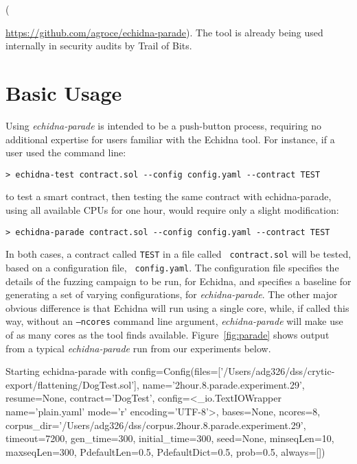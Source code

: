 \documentclass[sigconf]{acmart}
\begin{document}
({\url{https://github.com/agroce/echidna-parade}).  The tool is already being used internally in security audits by Trail of Bits.

\section{Basic Usage}

Using \emph{echidna-parade} is intended to be a push-button process,
requiring no additional expertise for users familiar with the Echidna
tool.  For instance, if a user used the command line:

{\scriptsize
\begin{verbatim}
> echidna-test contract.sol --config config.yaml --contract TEST
\end{verbatim}
  }

\noindent to test a smart contract, then testing the same contract with echidna-parade, using all
available CPUs for one hour, would require only a slight modification:

{\scriptsize
\begin{verbatim}
> echidna-parade contract.sol --config config.yaml --contract TEST
\end{verbatim}
  }

In both cases, a contract called {\tt TEST} in a file called {\tt
  contract.sol} will be tested, based on a configuration file, {\tt
  config.yaml}.  The configuration file specifies the details of the
fuzzing campaign to be run, for Echidna, and specifies a baseline for
generating a set of varying configurations, for
\emph{echidna-parade}.  The other major obvious difference is that Echidna
will run using a single core, while, if called this way, without an
{\tt --ncores} command line argument,
\emph{echidna-parade} will make use of as many cores as the tool
finds available.  Figure~\ref{fig:parade} shows output from a typical
\emph{echidna-parade} run from our experiments below.

\begin{figure*}
  {\scriptsize
    \begin{code}
Starting echidna-parade with
config=Config(files=['/Users/adg326/dss/crytic-export/flattening/DogTest.sol'],
  name='2hour.8.parade.experiment.29', resume=None, contract='DogTest',
  config=<\_io.TextIOWrapper name='plain.yaml' mode='r' encoding='UTF-8'>, bases=None, ncores=8,
  corpus\_dir='/Users/adg326/dss/corpus.2hour.8.parade.experiment.29', timeout=7200,
  gen\_time=300, initial\_time=300, seed=None, minseqLen=10,
  maxseqLen=300, PdefaultLen=0.5, PdefaultDict=0.5,
  prob=0.5, always=[])


\end{code}}
\end{figure*}}
\end{document}

